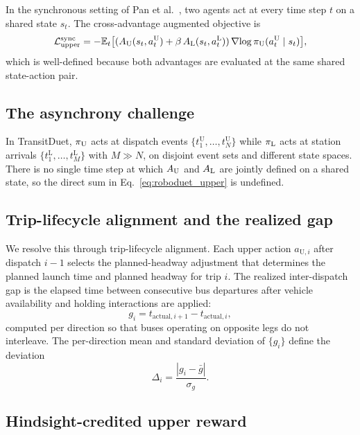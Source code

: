 In the synchronous setting of Pan et al.~\citep{pan2024roboduet}, two agents act at every time step $t$ on a shared state $s_t$. The cross-advantage augmented objective is
\begin{equation}
  \mathcal{L}_{\text{upper}}^{\text{sync}} = -\mathbb{E}_{t}\bigl[(A_{\mathrm{U}}(s_t, a_t^{\mathrm{U}}) + \beta\, A_{\mathrm{L}}(s_t, a_t^{\mathrm{L}}))\,\nabla\!\log\pi_{\mathrm{U}}(a_t^{\mathrm{U}} \mid s_t)\bigr],
  \label{eq:roboduet_upper}
\end{equation}
which is well-defined because both advantages are evaluated at the same shared state-action pair.

\subsection{The asynchrony challenge}

In TransitDuet, $\pi_{\mathrm{U}}$ acts at dispatch events $\{t_1^{\mathrm{U}}, \ldots, t_N^{\mathrm{U}}\}$ while $\pi_{\mathrm{L}}$ acts at station arrivals $\{t_1^{\mathrm{L}}, \ldots, t_M^{\mathrm{L}}\}$ with $M \gg N$, on disjoint event sets and different state spaces. There is no single time step at which $A_{\mathrm{U}}$ and $A_{\mathrm{L}}$ are jointly defined on a shared state, so the direct sum in Eq.~\eqref{eq:roboduet_upper} is undefined.

\subsection{Trip-lifecycle alignment and the realized gap}

We resolve this through trip-lifecycle alignment. Each upper action $a_{\mathrm{U},i}$ after dispatch $i-1$ selects the planned-headway adjustment that determines the planned launch time and planned headway for trip $i$. The realized inter-dispatch gap is the elapsed time between consecutive bus departures after vehicle availability and holding interactions are applied:
\begin{equation}
  g_i = t_{\mathrm{actual},i+1} - t_{\mathrm{actual},i},
\end{equation}
computed per direction so that buses operating on opposite legs do not interleave. The per-direction mean and standard deviation of $\{g_i\}$ define the deviation
\begin{equation}
  \Delta_i = \frac{|g_i - \bar{g}|}{\sigma_g}.
  \label{eq:gap_dev}
\end{equation}

\subsection{Hindsight-credited upper reward}

